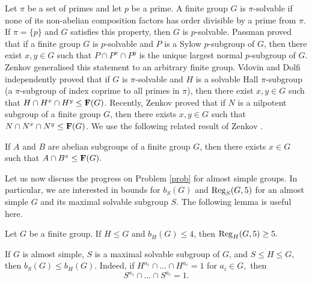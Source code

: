 Let $\pi$ be a set of primes and let $p$ be a prime. A finite group $G$ is $\pi$-solvable if 
none of its non-abelian composition factors has order divisible by a prime from  $\pi$. If $\pi=\{p\}$ and $G$ satisfies this property, then $G$ is $p$-solvable.  Passman \cite{passman} proved that if  a finite group $G$ is $p$-solvable and $P$ is a Sylow $p$-subgroup of $G$, then there exist $x,y \in G$ such that $P \cap P^x \cap P^y$ is  the unique largest normal $p$-subgroup of $G$. Zenkov \cite{ZenP} generalised this statement to an arbitrary finite group.  Vdovin \cite{vdovinReg} and Dolfi \cite{dolfi} independently proved that if $G$ is $\pi$-solvable and $H$ is a solvable Hall $\pi$-subgroup (a $\pi$-subgroup of index  coprime to all primes in $\pi$), then there exist $x,y \in G$ such that $H \cap H^x \cap H^y \le {\bf F}(G)$. Recently, Zenkov \cite{zen21}  proved that if $N$ is a nilpotent subgroup of a finite group $G$, then there exists $x,y \in G$ such that $N \cap N^x \cap N^y \le {\bf F}(G)$.  We use the following related result of Zenkov  \cite{zen}.

\begin{Th}
\label{zenab}
If $A$ and $B$ are abelian subgroups of a finite group $G$, then there exists $x \in G$ such that $A \cap B^x \le {\bf F}(G).$
\end{Th}



\bigskip

Let us now discuss the  progress on Problem \ref{prob} for almost simple groups. In particular, we are interested in bounds for $b_S(G)$ and $\mathrm{Reg}_S(G,5)$ for an almost simple $G$ and its maximal solvable subgroup $S$. The following lemma is useful here.

\begin{Lem} \label{base4}
Let $G$ be a finite group. If $H \le G$ and $b_H(G)\le 4$, then $\mathrm{Reg}_H(G,5)\ge 5.$
\end{Lem}




  If $G$ is almost simple, $S$ is a maximal solvable subgroup of $G$, and  $S \le H \le G$, then $b_S(G) \le b_H(G).$ Indeed, if $H^{a_1} \cap \ldots \cap H^{a_c}=1$ for $a_i \in G,$ then $$S^{a_1} \cap \ldots \cap S^{a_c}=1.$$ 



